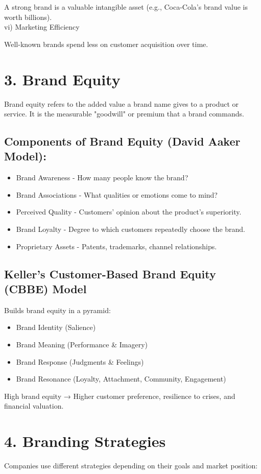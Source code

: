 \documentclass[10pt]{article}
\begin{document}
A strong brand is a valuable intangible asset (e.g., Coca-Cola's brand value is worth billions).\\
vi) Marketing Efficiency

Well-known brands spend less on customer acquisition over time.

\section*{3. Brand Equity}
Brand equity refers to the added value a brand name gives to a product or service. It is the measurable "goodwill" or premium that a brand commands.

\subsection*{Components of Brand Equity (David Aaker Model):}
\begin{itemize}
  \item Brand Awareness - How many people know the brand?
  \item Brand Associations - What qualities or emotions come to mind?
  \item Perceived Quality - Customers' opinion about the product's superiority.
  \item Brand Loyalty - Degree to which customers repeatedly choose the brand.
  \item Proprietary Assets - Patents, trademarks, channel relationships.
\end{itemize}

\subsection*{Keller's Customer-Based Brand Equity (CBBE) Model}
Builds brand equity in a pyramid:

\begin{itemize}
  \item Brand Identity (Salience)
  \item Brand Meaning (Performance \& Imagery)
  \item Brand Response (Judgments \& Feelings)
  \item Brand Resonance (Loyalty, Attachment, Community, Engagement)
\end{itemize}

High brand equity → Higher customer preference, resilience to crises, and financial valuation.

\section*{4. Branding Strategies}
Companies use different strategies depending on their goals and market position:
\end{document}
